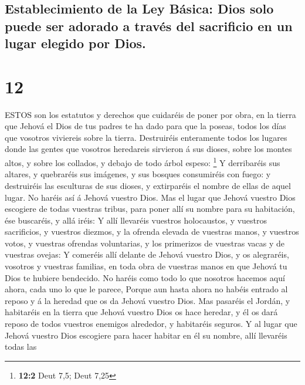 \hypertarget{establecimiento-de-la-ley-buxe1sica-dios-solo-puede-ser-adorado-a-travuxe9s-del-sacrificio-en-un-lugar-elegido-por-dios.}{%
\subsection{Establecimiento de la Ley Básica: Dios solo puede ser
adorado a través del sacrificio en un lugar elegido por
Dios.}\label{establecimiento-de-la-ley-buxe1sica-dios-solo-puede-ser-adorado-a-travuxe9s-del-sacrificio-en-un-lugar-elegido-por-dios.}}

\hypertarget{section-11}{%
\section{12}\label{section-11}}

 ESTOS son los estatutos y derechos que cuidaréis de poner
por obra, en la tierra que Jehová el Dios de tus padres te ha dado para
que la poseas, todos los días que vosotros viviereis sobre la tierra.
 Destruiréis enteramente todos los lugares donde las gentes
que vosotros heredareis sirvieron á sus dioses, sobre los montes altos,
y sobre los collados, y debajo de todo árbol espeso: \footnote{\textbf{12:2}
  Deut 7,5; Deut 7,25}  Y derribaréis sus altares, y
quebraréis sus imágenes, y sus bosques consumiréis con fuego: y
destruiréis las esculturas de sus dioses, y extirparéis el nombre de
ellas de aquel lugar.  No haréis así á Jehová vuestro Dios.
 Mas el lugar que Jehová vuestro Dios escogiere de todas
vuestras tribus, para poner allí su nombre para su habitación, ése
buscaréis, y allá iréis:  Y allí llevaréis vuestros
holocaustos, y vuestros sacrificios, y vuestros diezmos, y la ofrenda
elevada de vuestras manos, y vuestros votos, y vuestras ofrendas
voluntarias, y los primerizos de vuestras vacas y de vuestras ovejas:
 Y comeréis allí delante de Jehová vuestro Dios, y os
alegraréis, vosotros y vuestras familias, en toda obra de vuestras manos
en que Jehová tu Dios te hubiere bendecido.  No haréis como
todo lo que nosotros hacemos aquí ahora, cada uno lo que le parece,
 Porque aun hasta ahora no habéis entrado al reposo y á la
heredad que os da Jehová vuestro Dios.  Mas pasaréis el
Jordán, y habitaréis en la tierra que Jehová vuestro Dios os hace
heredar, y él os dará reposo de todos vuestros enemigos alrededor, y
habitaréis seguros.  Y al lugar que Jehová vuestro Dios
escogiere para hacer habitar en él su nombre, allí llevaréis todas las
